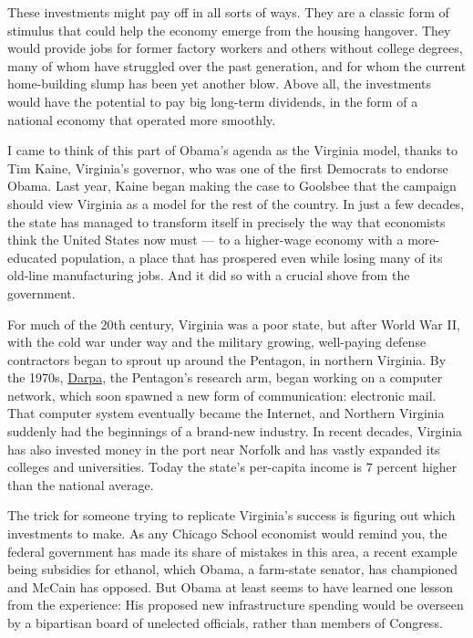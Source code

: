 These investments might pay off in all sorts of ways. They are a classic
form of stimulus that could help the economy emerge from the housing
hangover. They would provide jobs for former factory workers and others
without college degrees, many of whom have struggled over the past
generation, and for whom the current home-building slump has been yet
another blow. Above all, the investments would have the potential to pay
big long-term dividends, in the form of a national economy that operated
more smoothly.

I came to think of this part of Obama's agenda as the Virginia model,
thanks to Tim Kaine, Virginia's governor, who was one of the first
Democrats to endorse Obama. Last year, Kaine began making the case to
Goolsbee that the campaign should view Virginia as a model for the rest
of the country. In just a few decades, the state has managed to
transform itself in precisely the way that economists think the United
States now must --- to a higher-wage economy with a more-educated
population, a place that has prospered even while losing many of its
old-line manufacturing jobs. And it did so with a crucial shove from the
government.

For much of the 20th century, Virginia was a poor state, but after World
War II, with the cold war under way and the military growing,
well-paying defense contractors began to sprout up around the Pentagon,
in northern Virginia. By the 1970s,
\href{http://www.darpa.mil/body/overtheyears.html}{Darpa}, the
Pentagon's research arm, began working on a computer network, which soon
spawned a new form of communication: electronic mail. That computer
system eventually became the Internet, and Northern Virginia suddenly
had the beginnings of a brand-new industry. In recent decades, Virginia
has also invested money in the port near Norfolk and has vastly expanded
its colleges and universities. Today the state's per-capita income is 7
percent higher than the national average.

The trick for someone trying to replicate Virginia's success is figuring
out which investments to make. As any Chicago School economist would
remind you, the federal government has made its share of mistakes in
this area, a recent example being subsidies for ethanol, which Obama, a
farm-state senator, has championed and McCain has opposed. But Obama at
least seems to have learned one lesson from the experience: His proposed
new infrastructure spending would be overseen by a bipartisan board of
unelected officials, rather than members of Congress.

